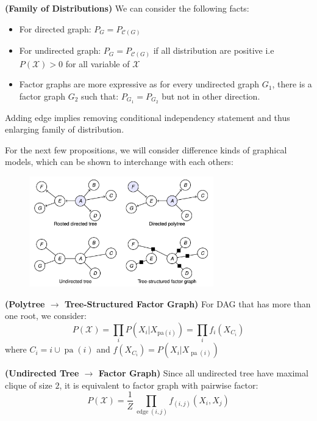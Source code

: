 \begin{remark}{\textbf{(Family of Distributions)}}
    We can consider the following facts:
    \begin{itemize}
        \item For directed graph: $P_G = P_{\mathcal{C}(G)}$
        \item For undirected graph: $P_G = P_{\mathcal{C}(G)}$ if all distribution are positive i.e $P(\mathcal{X})>0$ for all variable of $\mathcal{X}$
        \item Factor graphs are more expressive as for every undirected graph $G_1$, there is a factor graph $G_2$ such that: $P_{G_1} = P_{G_2}$ but not in other direction.
    \end{itemize}
    Adding edge implies removing conditional independency statement and thus enlarging family of distribution.
\end{remark}

\begin{remark}
    For the next few propositions, we will consider difference kinds of graphical models, which can be shown to interchange with each others:
    \begin{figure}[H]
        \centering
        \includegraphics[width=8cm]{img/img6.png}
    \end{figure}  
\end{remark}

\begin{proposition}{\textbf{(Polytree $\boldsymbol \rightarrow$ Tree-Structured Factor Graph)}}
    For DAG that has more than one root, we consider:
    \begin{equation*}
        P(\mathcal{X}) = \prod_i P(X_i | X_{\text{pa}(i)}) =\prod_if_i(X_{C_i})
    \end{equation*} 
    where $C_i = i \cup \operatorname{pa}(i)$ and $f(X_{C_i}) = P(X_i | X_{\operatorname{pa}(i)})$
\end{proposition}

\begin{proposition}{\textbf{(Undirected Tree $\boldsymbol \rightarrow$ Factor Graph)}}
    Since all undirected tree have maximal clique of size $2$, it is equivalent to factor graph with pairwise factor:
    \begin{equation*}
        P(\mathcal{X}) = \frac{1}{Z}\prod_{\operatorname{edge}(i,j)}f_{(i,j)}(X_i, X_j)
    \end{equation*}
\end{proposition}

